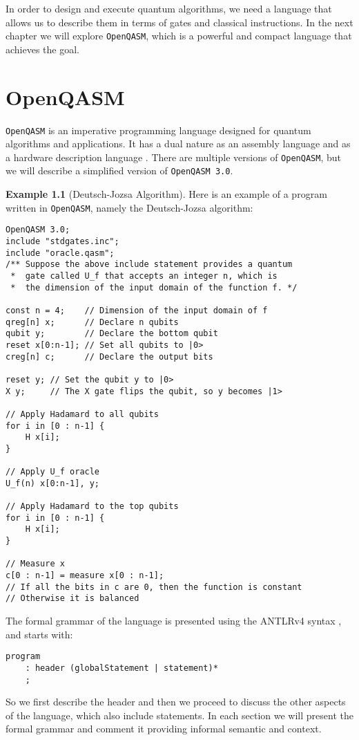 \documentclass[12pt,a4paper]{report}
\theoremstyle{definition}
\theoremstyle{definition}
\newtheorem{example}{Example}[section]
\theoremstyle{definition}
\begin{document}
In order to design and execute quantum algorithms, we need a language that allows us to describe them in terms of gates and classical instructions. In the next chapter we will explore \texttt{OpenQASM}, which is a powerful and compact language that achieves the goal.









\chapter{OpenQASM}
\texttt{OpenQASM} is an imperative programming language designed for quantum algorithms and applications. It has a dual nature as an assembly language and as a hardware description language \cite{qasm}. There are multiple versions of \texttt{OpenQASM}, but we will describe a simplified version of \texttt{OpenQASM 3.0}.\par
\begin{example}[Deutsch-Jozsa Algorithm] Here is an example of a program written in \texttt{OpenQASM}, namely the Deutsch-Jozsa algorithm:
\begin{lstlisting}
OpenQASM 3.0;
include "stdgates.inc";
include "oracle.qasm";
/** Suppose the above include statement provides a quantum 
 *  gate called U_f that accepts an integer n, which is
 *  the dimension of the input domain of the function f. */

const n = 4;    // Dimension of the input domain of f
qreg[n] x;      // Declare n qubits
qubit y;        // Declare the bottom qubit
reset x[0:n-1]; // Set all qubits to |0>
creg[n] c;      // Declare the output bits

reset y; // Set the qubit y to |0>
X y;     // The X gate flips the qubit, so y becomes |1>

// Apply Hadamard to all qubits
for i in [0 : n-1] {
    H x[i];
}

// Apply U_f oracle
U_f(n) x[0:n-1], y;

// Apply Hadamard to the top qubits
for i in [0 : n-1] {
    H x[i];
}

// Measure x
c[0 : n-1] = measure x[0 : n-1];
// If all the bits in c are 0, then the function is constant
// Otherwise it is balanced
\end{lstlisting}
\end{example}
The formal grammar of the language is presented using the ANTLRv4 syntax \cite{antlr}, and starts with:
\begin{lstlisting}
program
    : header (globalStatement | statement)*
    ;
\end{lstlisting}
So we first describe the header and then we proceed to discuss the other aspects of the language, which also include statements. In each section we will present the formal grammar and comment it providing informal semantic and context.
\end{document}
